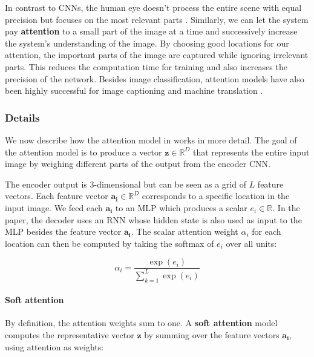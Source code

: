 
In contrast to CNNs, the human eye doesn't process the entire scene with equal precision but focuses on the most relevant parts \cite{DeepMindAttention}.
Similarly, we can let the system pay \textbf{attention} to a small part of the image at a time and successively increase the system's understanding of the image.
By choosing good locations for our attention, the important parts of the image are captured while ignoring irrelevant parts.
This reduces the computation time for training and also increases the precision of the network.
Besides image classification, attention models have also been highly successful for image captioning \cite{AttendAndTell} and machine translation \cite{machine_translation_attention}.

\subsubsection{Details}
We now describe how the attention model in \cite{AttendAndTell} works in more detail.
The goal of the attention model is to produce a vector $\mathbf{z} \in \mathbb{R}^D$ that represents the entire input image by weighing different parts of the output from the encoder CNN.

The encoder output is 3-dimensional but can be seen as a grid of $L$ feature vectors. Each feature vector $\mathbf{a_i} \in \mathbb{R}^D$ corresponds to a specific location in the input image. We feed each $\mathbf{a_i}$ to an MLP which produces a scalar $e_i \in \mathbb{R}$. In the paper, the decoder uses an RNN whose hidden state is also used as input to the MLP besides the feature vector $\mathbf{a_i}$.
The scalar attention weight $\alpha_i$ for each location can then be computed by taking the softmax of $e_i$ over all units:

\[
\alpha_i = \frac{ \exp(e_i) }{ \sum_{k=1}^L \exp(e_i) }
\]

\paragraph{Soft attention}
By definition, the attention weights sum to one. A \textbf{soft attention} model computes the representative vector $\mathbf{z}$ by summing over the feature vectors $\mathbf{a_i}$, using attention as weights:

